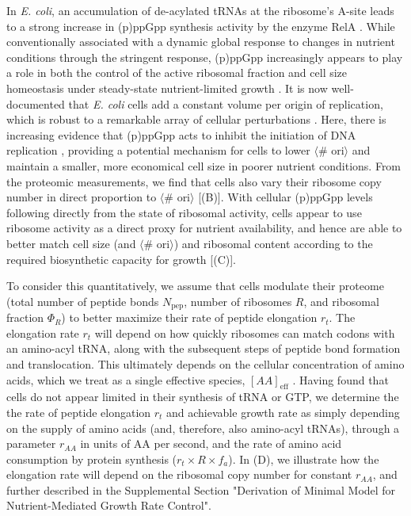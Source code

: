 In \textit{E. coli}, an accumulation of de-acylated tRNAs at the ribosome's
A-site leads to a strong increase in (p)ppGpp synthesis activity by the enzyme
RelA \citep{hauryliuk2015}. While conventionally associated with a dynamic
global response to changes in nutrient conditions through the stringent
response, (p)ppGpp increasingly appears to play a role in both the control of
the active ribosomal fraction and cell size homeostasis under steady-state
nutrient-limited growth \citep{dai2016, zhu2019, Buke2020, vadia2017,
parker2020}. It is now well-documented that \textit{E. coli} cells add a
constant volume per origin of replication, which is robust to a remarkable array
of cellular perturbations \citep{si2017}. Here, there is increasing evidence
that (p)ppGpp acts to inhibit the initiation of DNA replication
\citep{fernandezcoll2020}, providing a potential mechanism for cells to lower
$\langle$\# ori$\rangle$ and maintain a smaller, more economical cell size in
poorer nutrient conditions. From the proteomic measurements, we find that cells
also vary their ribosome copy number in direct proportion to $\langle$\#
ori$\rangle$ [(B)]. With cellular (p)ppGpp levels
following directly from the state of ribosomal activity, cells appear to use
ribosome activity as a direct proxy for nutrient availability, and hence are
able to better match cell size (and $\langle$\# ori$\rangle$) and ribosomal
content according to the required biosynthetic capacity for growth
[(C)].

To consider this quantitatively, we assume that cells modulate their proteome
(total number of peptide bonds $N_\text{pep}$, number of ribosomes $R$, and
ribosomal fraction $\Phi_R$) to better maximize their rate of peptide elongation
$r_t$. The elongation rate $r_t$ will depend on how quickly ribosomes can match
codons with an amino-acyl tRNA, along with the subsequent steps of peptide bond
formation and translocation. This ultimately depends on the cellular
concentration of amino acids, which we treat as a single effective species,
$[AA]_\text{eff}$ \citep{bosdriesz2015}. Having found that cells do not appear limited
in their synthesis of tRNA or GTP, we determine the the rate of peptide elongation
$r_t$ and achievable growth rate as simply depending on the supply of amino
acids (and, therefore, also amino-acyl tRNAs), through a parameter $r_{AA}$ in
units of AA per second, and the rate of amino acid consumption by protein
synthesis ($r_t \times R \times f_a$). In (D), we
illustrate how the elongation rate will depend on the ribosomal copy number for
constant $r_{AA}$, and further described in the Supplemental Section
"Derivation of Minimal Model for Nutrient-Mediated Growth Rate Control".


